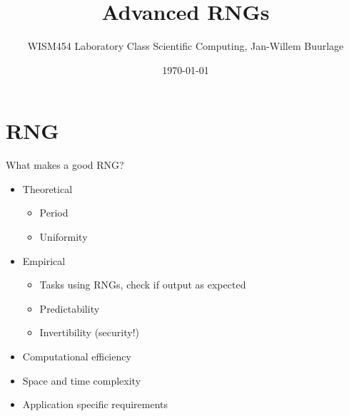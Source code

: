 \documentclass[10pt]{beamer}
\author{WISM454 Laboratory Class Scientific Computing, Jan-Willem Buurlage}
\date{\today}
\title{Advanced RNGs}
\begin{document}
\maketitle

\section{RNG}
\label{sec:orgfe94112}
\begin{frame}[label={sec:org2736b12}]{What makes a good RNG?}
\begin{itemize}
\item \alert{Theoretical}
\begin{itemize}
\item Period
\item Uniformity
\end{itemize}
\item \alert{Empirical}
\begin{itemize}
\item Tasks using RNGs, check if output as expected
\item Predictability
\item Invertibility (security!)
\end{itemize}
\item \alert{Computational efficiency}
\item \alert{Space and time complexity}
\item \alert{Application specific requirements}
\end{itemize}
\end{frame}
\end{document}
